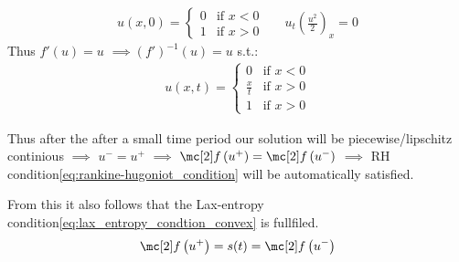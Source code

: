 \begin{examplebox}\nospacing
    \begin{example}\label{example:cor:rarefaction_solution_riemann_problem}
        \begin{align*}
          u(x,0)=
          \begin{cases}
              0 &\text{if }x<0\\
              1 &\text{if }x>0
          \end{cases}&&u_{t}\left(\frac{u^{2}}{2}\right)_{x}=0
        \end{align*}
        Thus $f'(u)=u$ $\implies (f')^{-1}(u)=u$ s.t.:
        \begin{align*}
          u(x,t)=
          \begin{cases}
              0 &\text{if }x<0\\
              \frac{x}{t} &\text{if }x>0\\
              1 &\text{if }x>0
          \end{cases}
        \end{align*}
        \begin{minipage}{0.4\textwidth}
            \begin{figure}[H]
                \centering{
                  \def\svgwidth{70pt}
                  \resizebox{\linewidth}{!}{}
                }
            \end{figure}
        \end{minipage}\hfill
        \begin{minipage}{0.55\textwidth}
            \begin{figure}[H]
                \centering{
                  \def\svgwidth{110pt}
                  \resizebox{\linewidth}{!}{}
                }
            \end{figure}
        \end{minipage}
        \begin{itemizenosep}
            \item Thus after the after a small time period our solution will be piecewise/lipschitz continious $\implies$ $u^{-}=u^{+}$  $\implies$
            $\flux\left(u^{+}\right)=\flux\left(u^{-}\right)$ $\implies$ RH condition\cref{eq:rankine-hugoniot_condition} will be automatically satisfied.
            \item From this it also follows that the Lax-entropy condition\cref{eq:lax_entropy_condtion_convex} is fullfiled.
            \begin{align*}
              \flux\left(u^{+}\right)=s(t)=\flux\left(u^{-}\right)
            \end{align*}
        \end{itemizenosep}
    \end{example}
\end{examplebox}
